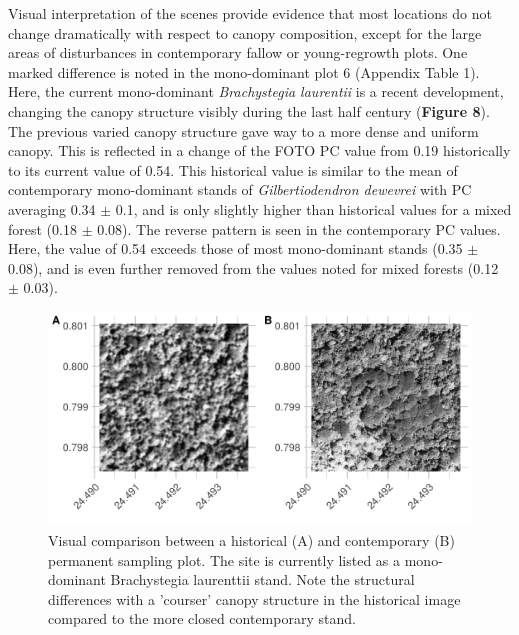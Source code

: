 \documentclass[remote sensing,article,submit,moreauthors,pdftex]{mdpi}
\begin{document}
Visual interpretation of the scenes provide evidence that most locations
do not change dramatically with respect to canopy composition, except
for the large areas of disturbances in contemporary fallow or
young-regrowth plots. One marked difference is noted in the
mono-dominant plot 6 (Appendix Table 1). Here, the current mono-dominant
\emph{Brachystegia laurentii} is a recent development, changing the
canopy structure visibly during the last half century (\textbf{Figure
8}). The previous varied canopy structure gave way to a more dense and
uniform canopy. This is reflected in a change of the FOTO PC value from
0.19 historically to its current value of 0.54. This historical value is
similar to the mean of contemporary mono-dominant stands of
\emph{Gilbertiodendron dewevrei} with PC averaging 0.34 \(\pm\) 0.1, and
is only slightly higher than historical values for a mixed forest (0.18
\(\pm\) 0.08). The reverse pattern is seen in the contemporary PC
values. Here, the value of 0.54 exceeds those of most mono-dominant
stands (0.35 \(\pm\) 0.08), and is even further removed from the values
noted for mixed forests (0.12 \(\pm\) 0.03).

\begin{figure}

{\centering \includegraphics[width=1\linewidth]{./figures/visual_comparison_psp} 

}

\caption{Visual comparison between a historical (A) and contemporary (B) permanent sampling plot. The site is currently listed as a mono-dominant Brachystegia laurenttii stand. Note the structural differences with a 'courser' canopy structure in the historical image compared to the more closed contemporary stand.}\label{fig:unnamed-chunk-12}
\end{figure}
\end{document}
